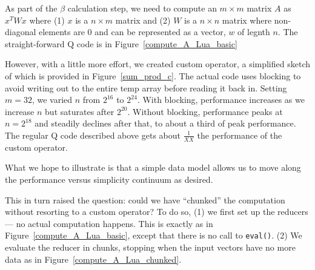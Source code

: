 As part of the \(\beta\) calculation step, we need to compute an \(m \times m\)
matrix \(A\) as  \(x^T W x\) where (1) 
\(x\) is a \(n \times m\) matrix and (2) \(W\) is a \(n \times n\) matrix where
non-diagonal elements are 0 and can be represented as a vector, \(w\) of legnth
\(n\). 
The straight-forward Q code is in Figure~\ref{compute_A_Lua_basic}
\begin{figure}
\centering
{}
\end{figure}

However, with a little more effort, we created custom operator, 
a simplified sketch of which is provided in Figure~\ref{sum_prod_c}. The actual code
uses blocking to avoid writing out to the entire temp array before reading it
back in. Setting \(m=32\), we varied \(n\) from \(2^{16}\) to \(2^{24}\). With
blocking, performance increases as we increase \(n\) but saturates after
\(2^{20}\). Without blocking, performance peaks at \(n=2^{18}\) and steadily
declines after that, to about a third of peak performance.
The regular Q code described above gets about
\(\frac{1}{XX}\) the performance of the custom operator. 

What we hope to illustrate is that a
simple data model allows us to move along the performance versus simplicity
continuum as desired.

\begin{figure}
\centering
{}
\end{figure}

This in turn raised the question: could we have ``chunked'' the computation 
without resorting to a custom operator? To do so, (1)
we first set up the reducers --- no actual
computation happens. This is exactly as in Figure~\ref{compute_A_Lua_basic}, except that there is no call to
{\tt eval()}. (2) We evaluate the reducer in chunks, stopping
when the input vectors have no more data as in
Figure~\ref{compute_A_Lua_chunked}.
\begin{figure}
\centering
{}
\end{figure}

